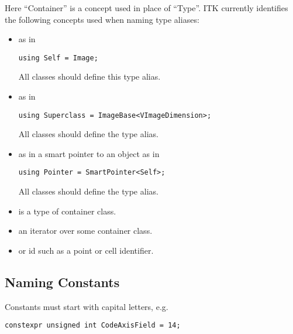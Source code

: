 Here ``Container'' is a concept used in place of ``Type''. ITK currently
identifies the following concepts used when naming type aliases:

\begin{itemize}
\item \textbf{} as in

\small
\begin{verbatim}
using Self = Image;
\end{verbatim}
\normalsize

All classes should define this type alias.
\item \textbf{} as in

\small
\begin{verbatim}
using Superclass = ImageBase<VImageDimension>;
\end{verbatim}
\normalsize

All classes should define the  type alias.
\item \textbf{} as in a smart pointer to an object as in

\begin{verbatim}
using Pointer = SmartPointer<Self>;
\end{verbatim}
\normalsize

All classes should define the  type alias.
\item \textbf{} is a type of container class.
\item \textbf{} an iterator over some container class.
\item \textbf{} or id such as a point or cell identifier.
\end{itemize}


\subsection{Naming Constants}
\label{subsec:NamingConstants}

Constants must start with capital letters, e.g.

\small
\begin{verbatim}
constexpr unsigned int CodeAxisField = 14;
\end{verbatim}
\normalsize


